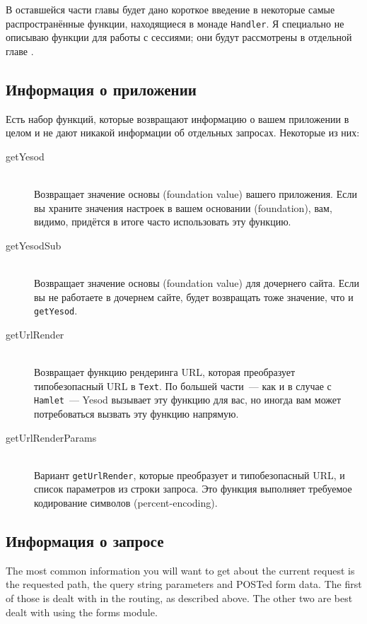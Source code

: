 В оставшейся части главы будет дано короткое введение в некоторые
самые распространённые функции, находящиеся в монаде
\lstinline!Handler!. Я специально не описываю функции для работы с
сессиями; они будут рассмотрены в отдельной главе .

\subsection{Информация о приложении}
Есть набор функций, которые возвращают информацию о вашем приложении в
целом и не дают никакой информации об отдельных запросах. Некоторые из
них:
\begin{description}
\item[getYesod] \hfill \\
Возвращает значение основы (foundation value) вашего приложения. Если вы
храните значения настроек в вашем основании (foundation), вам, видимо,
придётся в итоге часто использовать эту функцию.

\item[getYesodSub] \hfill \\
Возвращает значение основы (foundation value) для дочернего сайта. Если вы
не работаете в дочернем сайте, будет возвращать тоже значение, что и
\lstinline!getYesod!.

\item[getUrlRender] \hfill \\
Возвращает функцию рендеринга URL, которая преобразует типобезопасный
URL в \lstinline!Text!. По большей части~--- как и в случае с
\lstinline!Hamlet!~--- Yesod вызывает эту функцию для вас, но иногда
вам может потребоваться вызвать эту функцию напрямую.

\item[getUrlRenderParams]  \hfill \\
Вариант \lstinline!getUrlRender!, которые преобразует и
типобезопасный URL, и список параметров из строки запроса. Это функция
выполняет требуемое кодирование символов (percent-encoding).
\end{description}

\subsection{Информация о запросе}

The most common information you will want to get about the current
request is the requested path, the query string parameters and POSTed
form data. The first of those is dealt with in the routing, as
described above. The other two are best dealt with using the forms
module.

